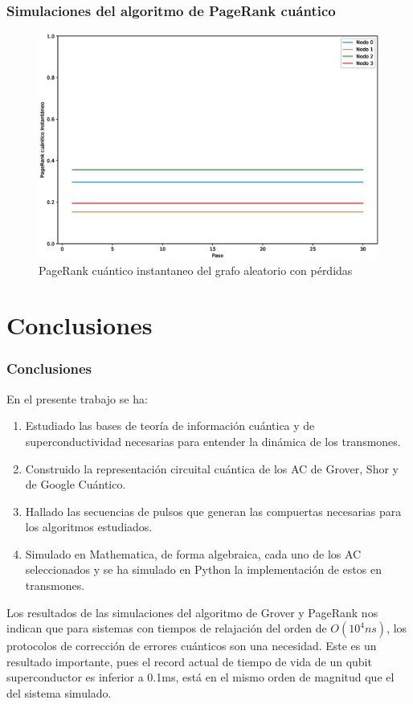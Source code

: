 \documentclass[xetex,mathserif,serif, 8pt]{beamer}
\begin{document}
\begin{frame}
    \frametitle{Simulaciones del algoritmo de PageRank cuántico}

    \begin{figure}[H]
            \centering
            \includegraphics[width=0.9\linewidth]{img/any-inst-lossy.eps}
            \caption{PageRank cuántico instantaneo del grafo aleatorio con pérdidas}
    \end{figure}

\end{frame}


\section{Conclusiones}

\begin{frame}
    \frametitle{Conclusiones}

    En el presente trabajo se ha:

    \begin{enumerate}
        \item Estudiado las bases de teoría de información cuántica y de superconductividad necesarias para entender la dinámica de los transmones.
        \item Construido la representación circuital cuántica de los AC de Grover, Shor y de Google Cuántico.
        \item Hallado las secuencias de pulsos que generan las compuertas necesarias para los algoritmos estudiados.
        \item Simulado en Mathematica, de forma algebraica, cada uno de los AC seleccionados y se ha simulado en Python la implementación de estos en transmones.
    \end{enumerate}

    Los resultados de las simulaciones del algoritmo de Grover y PageRank nos indican que para sistemas con tiempos de relajación del orden de $O(10^4 ns)$, los protocolos de corrección de errores cuánticos son una necesidad. Este es un resultado importante, pues el record actual de tiempo de vida de un qubit superconductor es inferior a 0.1ms, está en el mismo orden de magnitud que el del sistema simulado.

\end{frame}
\end{document}

